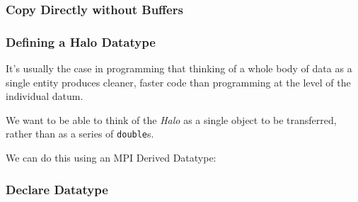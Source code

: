 \subsubsection{Copy Directly without
Buffers}\label{copy-directly-without-buffers}

\begin{Shaded}
\begin{Highlighting}[]

 
\NormalTok{\}}
\end{Highlighting}
\end{Shaded}

\subsubsection{Defining a Halo Datatype}\label{defining-a-halo-datatype}

It's usually the case in programming that thinking of a whole body of
data as a single entity produces cleaner, faster code than programming
at the level of the individual datum.

We want to be able to think of the \emph{Halo} as a single object to be
transferred, rather than as a series of \texttt{double}s.

We can do this using an MPI Derived Datatype:

\subsubsection{Declare Datatype}\label{declare-datatype}

\begin{Shaded}
\begin{Highlighting}[]

 
\NormalTok{\}}
\end{Highlighting}
\end{Shaded}

